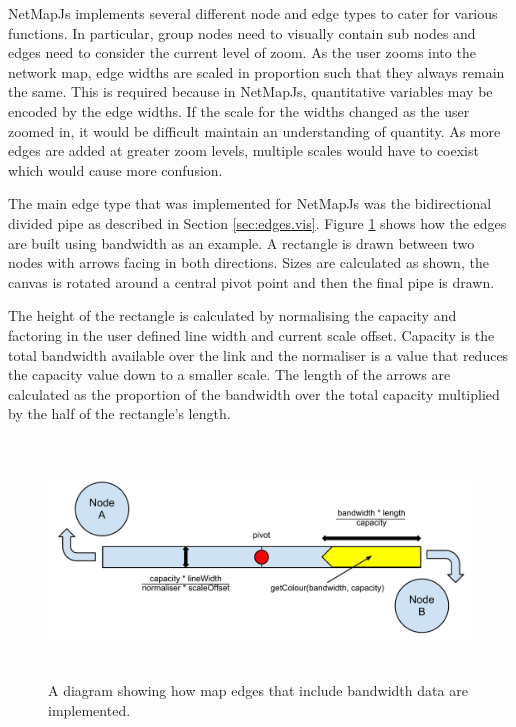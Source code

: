 \documentclass[11pt, a4paper]{article}
\begin{document}
NetMapJs implements several different node and edge types to cater for various
functions. In particular, group nodes need to visually contain sub nodes and
edges need to consider the current level of zoom. As the user zooms into the
network map, edge widths are scaled in proportion such that they always remain
the same. This is required because in NetMapJs, quantitative variables may be
encoded by the edge widths. If the scale for the widths changed as the user
zoomed in, it would be difficult maintain an understanding of quantity. As more
edges are added at greater zoom levels, multiple scales would have to coexist
which would cause more confusion.

The main edge type that was implemented for NetMapJs was the bidirectional
divided pipe as described in Section \ref{sec:edges.vis}. Figure
\ref{fig:nodesedges1.0} shows how the edges are built using bandwidth as an
example. A rectangle is drawn between two nodes with arrows facing in both
directions. Sizes are calculated as shown, the canvas is rotated around a
central pivot point and then the final pipe is drawn.

The height of the rectangle is calculated by normalising the capacity and
factoring in the user defined line width and current scale offset.
Capacity is the total bandwidth available over the link and the normaliser is a
value that reduces the capacity value down to a smaller scale. The length of the
arrows are calculated as the proportion of the bandwidth over the total capacity
multiplied by the half of the rectangle's length.



\begin{figure}
\centering
\includegraphics[width=170mm,height=63.24mm]{assets/nodesedges1-0.pdf}
\caption{A diagram showing how map edges that include bandwidth data are implemented.}
\label{fig:nodesedges1.0}
\end{figure}
\end{document}
